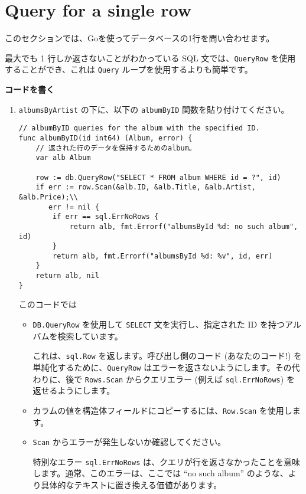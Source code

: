 \section{Query for a single row}

このセクションでは、Goを使ってデータベースの1行を問い合わせます。

最大でも 1 行しか返さないことがわかっている SQL
文では、\texttt{QueryRow} を使用することができ、これは \texttt{Query}
ループを使用するよりも簡単です。

\textbf{コードを書く}

\begin{enumerate}
\item
  \texttt{albumsByArtist} の下に、以下の \texttt{albumByID}
  関数を貼り付けてください。
\begin{lstlisting}[numbers=none]
// albumByID queries for the album with the specified ID.
func albumByID(id int64) (Album, error) {
    // 返された行のデータを保持するためのalbum。
    var alb Album

    row := db.QueryRow("SELECT * FROM album WHERE id = ?", id)
    if err := row.Scan(&alb.ID, &alb.Title, &alb.Artist, &alb.Price);\\
       err != nil {
        if err == sql.ErrNoRows {
            return alb, fmt.Errorf("albumsById %d: no such album", id)
        }
        return alb, fmt.Errorf("albumsById %d: %v", id, err)
    }
    return alb, nil
}
\end{lstlisting}


  このコードでは

  \begin{itemize}
  \item
    \texttt{DB.QueryRow} を使用して \texttt{SELECT}
    文を実行し、指定された ID を持つアルバムを検索しています。

    これは、\texttt{sql.Row} を返します。呼び出し側のコード
    (あなたのコード!) を単純化するために、\texttt{QueryRow}
    はエラーを返さないようにします。その代わりに、後で
    \texttt{Rows.Scan} からクエリエラー (例えば \texttt{sql.ErrNoRows})
    を返せるようにします。
  \item
    カラムの値を構造体フィールドにコピーするには、\texttt{Row.Scan}
    を使用します。
  \item
    \texttt{Scan} からエラーが発生しないか確認してください。

    特別なエラー \texttt{sql.ErrNoRows}
    は、クエリが行を返さなかったことを意味します。通常、このエラーは、ここでは
    ``no such album''
    のような、より具体的なテキストに置き換える価値があります。
  \end{itemize}



\end{enumerate}

